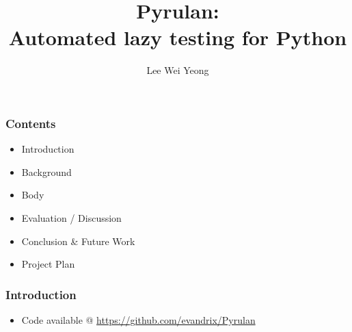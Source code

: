 \documentclass[t]{beamer}
\author{Lee Wei Yeong}
\title[lwy08@ic.ac.uk]{Pyrulan:\\Automated lazy testing for Python}
\begin{document}
\frame{\maketitle}
\begin{frame}
\frametitle{Contents}
	\begin{itemize}
	\item Introduction
	\item Background
	\item Body
	\item Evaluation / Discussion
	\item Conclusion \& Future Work
	\item Project Plan
	\end{itemize}
\end{frame}
\begin{frame}
\frametitle{Introduction}
	\begin{itemize}
	\item Code available @ \url{https://github.com/evandrix/Pyrulan}
	\end{itemize}
\end{frame}
\end{document}

